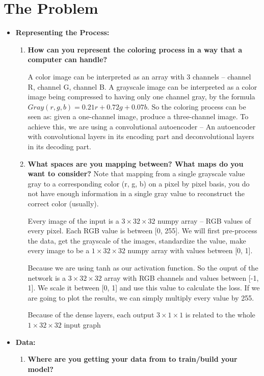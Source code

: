 \documentclass[letter]{article}
\begin{document}
\section{The Problem}
\label{sec:The Problem}
\begin{itemize}
	\item {\textbf{Representing the Process:}   } 
	\begin{enumerate}
		\item {\textbf{How can you represent the coloring process in a way that a computer can handle?}}
		\par{A color image can be interpreted as an array with 3 channels -- channel R,  channel G, channel B. A grayscale image can be interpreted as a color image being compressed to having only one channel gray, by the formula $ Gray(r, g, b) = 0.21r + 0.72g + 0.07b $. So the coloring process can be seen as: given a one-channel image, produce a three-channel image. To achieve this, we are using a convolutional autoencoder -- An autoencoder with convolutional layers in its encoding part and deconvolutional layers in its decoding part.}
		\item {\textbf{What spaces are you mapping between? What maps do you want to consider?} Note that mapping
			from a single grayscale value gray to a corresponding color (r, g, b) on a pixel by pixel basis, you do not have
			enough information in a single gray value to reconstruct the correct color (usually).}
		\par{Every image of the input is a $ 3 \times 32 \times 32 $ numpy array -- RGB values of every pixel. Each RGB value is between [0, 255]. We will first pre-process the data, get the grayscale of the images, standardize the value, make every image to be a $ 1 \times 32 \times 32 $ numpy array with values between [0, 1]. }
		\par{Because we are using tanh as our activation function. So the ouput of the network is a $ 3 \times 32 \times 32 $ array with RGB channels and values between [-1, 1]. We scale it between [0, 1] and use this value to calculate the loss. If we are going to plot the results, we can simply multiply every value by 255.}
		\par{Because of the dense layers, each output $ 3 \times 1 \times 1 $ is related to the whole $ 1 \times 32 \times 32 $ input graph}
	\end{enumerate}
	\item {\textbf{Data:}} 
	\begin{enumerate}
		\item {\textbf{Where are you getting your data from to train/build your model?}}

\end{enumerate}
\end{itemize}
\end{document}
